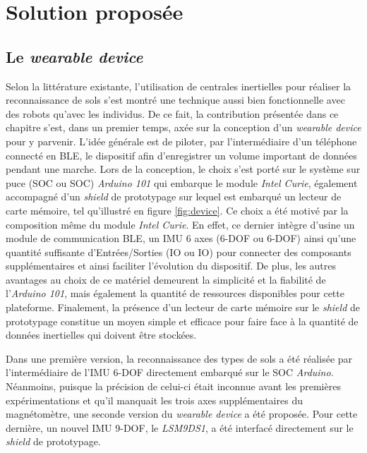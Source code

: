 \section{Solution proposée}

\subsection{Le \textit{wearable device}}

Selon la littérature existante, l'utilisation de centrales inertielles pour réaliser la reconnaissance de sols s'est montré une technique aussi bien fonctionnelle avec des robots qu'avec les individus. De ce fait, la contribution présentée dans ce chapitre s'est, dans un premier temps, axée sur la conception d'un \textit{wearable device} pour y parvenir. L'idée générale est de piloter, par l'intermédiaire d'un téléphone connecté en \acs{BLE}, le dispositif afin d'enregistrer un volume important de données pendant une marche. Lors de la conception, le choix s'est porté sur le système sur puce (\acl{SOC} ou \acs{SOC}) \textit{Arduino 101} qui embarque le module \textit{Intel Curie}, également accompagné d'un \textit{shield} de prototypage sur lequel est embarqué un lecteur de carte mémoire, tel qu'illustré en figure \ref{fig:device}. Ce choix a été motivé par la composition même du module \textit{Intel Curie}. En effet, ce dernier intègre d'usine un module de communication \acs{BLE}, un \acs{IMU} 6 axes (6-\acl{DOF} ou 6-\acs{DOF}) ainsi qu'une quantité suffisante d'Entrées/Sorties (\acl{IO} ou \acs{IO}) pour connecter des composants supplémentaires et ainsi faciliter l'évolution du dispositif. De plus, les autres avantages au choix de ce matériel demeurent la simplicité et la fiabilité de l'\textit{Arduino 101}, mais également la quantité de ressources disponibles pour cette plateforme. Finalement, la présence d'un lecteur de carte mémoire sur le \textit{shield} de prototypage constitue un moyen simple et efficace pour faire face à la quantité de données inertielles qui doivent être stockées.

Dans une première version, la reconnaissance des types de sols a été réalisée par l'intermédiaire de l'IMU 6-\acs{DOF} directement embarqué sur le \acs{SOC} \textit{Arduino}. Néanmoins, puisque la précision de celui-ci était inconnue avant les premières expérimentations et qu'il manquait les trois axes supplémentaires du magnétomètre, une seconde version du \textit{wearable device} a été proposée. Pour cette dernière, un nouvel IMU 9-\acs{DOF}, le \textit{LSM9DS1}, a été interfacé directement sur le \textit{shield} de prototypage.

